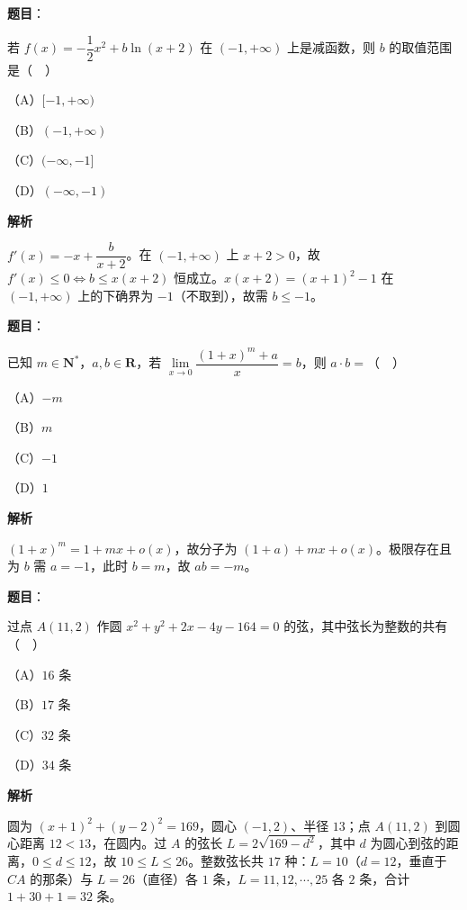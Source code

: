 \begin{answer}

\textbf{题目}：

若 $f(x)=-\dfrac12x^2+b\ln(x+2)$ 在 $(-1,+\infty)$ 上是减函数，则 $b$ 的取值范围是（　）

（A）$[-1,+\infty)$

（B）$(-1,+\infty)$

（C）$(-\infty,-1]$

（D）$(-\infty,-1)$

\textbf{解析}

$f'(x)=-x+\dfrac b{x+2}$。在 $(-1,+\infty)$ 上 $x+2>0$，故 $f'(x)\leqslant0\iff b\leqslant x(x+2)$ 恒成立。$x(x+2)=(x+1)^2-1$ 在 $(-1,+\infty)$ 上的下确界为 $-1$（不取到），故需 $b\leqslant-1$。


\end{answer}
\begin{answer}

\textbf{题目}：

已知 $m\in\mathbf N^*$，$a,b\in\mathbf R$，若 $\lim\limits_{x\to0}\dfrac{(1+x)^m+a}x=b$，则 $a\cdot b=$（　）

（A）$-m$

（B）$m$

（C）$-1$

（D）$1$

\textbf{解析}

$(1+x)^m=1+mx+o(x)$，故分子为 $(1+a)+mx+o(x)$。极限存在且为 $b$ 需 $a=-1$，此时 $b=m$，故 $ab=-m$。


\end{answer}
\begin{answer}

\textbf{题目}：

过点 $A(11,2)$ 作圆 $x^2+y^2+2x-4y-164=0$ 的弦，其中弦长为整数的共有（　）

（A）$16$ 条

（B）$17$ 条

（C）$32$ 条

（D）$34$ 条

\textbf{解析}

圆为 $(x+1)^2+(y-2)^2=169$，圆心 $(-1,2)$、半径 $13$；点 $A(11,2)$ 到圆心距离 $12<13$，在圆内。过 $A$ 的弦长 $L=2\sqrt{169-d^2}$，其中 $d$ 为圆心到弦的距离，$0\leqslant d\leqslant12$，故 $10\leqslant L\leqslant26$。整数弦长共 $17$ 种：$L=10$（$d=12$，垂直于 $CA$ 的那条）与 $L=26$（直径）各 $1$ 条，$L=11,12,\cdots,25$ 各 $2$ 条，合计 $1+30+1=32$ 条。


\end{answer}
